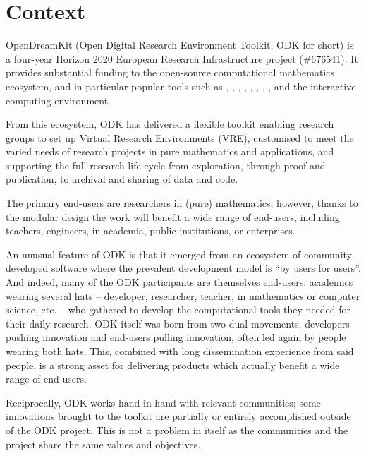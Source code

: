 \documentclass{deliverablereport}
\author{Nicolas M. Thiéry et al.}
\begin{document}
\enlargethispage{4ex}
\maketitle
\githubissuedescription
\tableofcontents\newpage


\section{Context}

OpenDreamKit (Open Digital Research Environment Toolkit, ODK for
short) is a four-year Horizon 2020 European Research Infrastructure
project (\#676541). It provides substantial funding to the open-source
computational mathematics ecosystem, and in particular popular tools
such as \Linbox, \MPIR, \Sage, \GAP, \PariGP, \LMFDB, \Singular,
\MathHub, and the \Jupyter interactive computing environment.

From this ecosystem, ODK has delivered a flexible toolkit
enabling research groups to set up Virtual Research Environments
(VRE), customised to meet the varied needs of research projects in
pure mathematics and applications, and supporting the full research
life-cycle from exploration, through proof and publication, to
archival and sharing of data and code.

The primary end-users are researchers in (pure) mathematics; however,
thanks to the modular design the work will benefit a wide range of
end-users, including teachers, engineers, in academia, public
institutions, or enterprises.

An unusual feature of ODK is that it emerged from an ecosystem of
community-developed software where the prevalent development model is
``by users for users''. And indeed, many of the ODK participants are
themselves end-users: academics wearing several hats -- developer,
researcher, teacher, in mathematics or computer science, etc. -- who
gathered to develop the computational tools they needed for their daily
research. ODK itself was born from two dual movements,
developers pushing innovation and end-users pulling innovation,
often led again by people wearing both hats. This, combined with long
dissemination experience from said people, is a strong asset for
delivering products which actually benefit a wide range of end-users.

Reciprocally, ODK works hand-in-hand with relevant communities; some
innovations brought to the toolkit are partially or entirely
accomplished outside of the ODK project. This is not a
problem in itself as the communities and the project share the same
values and objectives.
\end{document}
